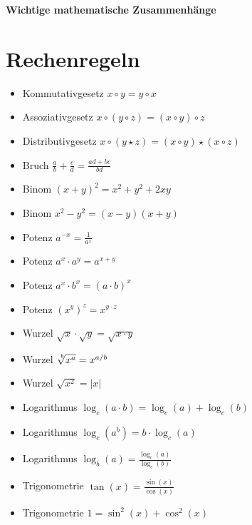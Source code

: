 \documentclass[a4paper,10pt]{article}
\begin{document}
\begin{center}
{\bf {\huge Wichtige mathematische Zusammenhänge}}
\end{center}

\section {Rechenregeln}

\begin{multicols}{2}

\begin{itemize}
\item Kommutativgesetz $x \circ y = y \circ x$
\item Assoziativgesetz $x \circ (y \circ z) = (x \circ y) \circ z$
\item Distributivgesetz $x \circ (y \star z) = (x \circ y) \star (x \circ z)$
\item Bruch $\frac{a}{b} + \frac{c}{d} = \frac{ad+bc}{bd}$
\item Binom $(x+y)^2=x^2+y^2+2xy$
\item Binom $x^2-y^2=(x-y)(x+y)$
\item Potenz $a^{-x} = \frac{1}{a^x}$
\item Potenz $a^x\cdot a^y = a^{x+y}$
\item Potenz $a^x\cdot b^x = (a\cdot b)^x$
\item Potenz $\left(x^y\right)^z = x^{y\cdot z}$
\item Wurzel $\sqrt{x} \cdot \sqrt{y} = \sqrt{x\cdot y}$
\item Wurzel $\sqrt[\leftroot{-2}\uproot{2}b]{x^a} = x^{a/b}$
\item Wurzel $\sqrt{x^2} = |x|$
\item Logarithmus $\log_c(a\cdot b) = \log_c(a) + \log_c(b)$
\item Logarithmus $\log_c(a ^ b) = b\cdot \log_c(a)$
\item Logarithmus $\log_b(a) = \frac{\log_c(a)}{\log_c(b)}$
\item Trigonometrie $\tan(x) = \frac{\sin(x)}{\cos(x)}$
\item Trigonometrie $1 = \sin^2(x) + \cos^2(x)$
\end{itemize}


\end{multicols}
\end{document}
